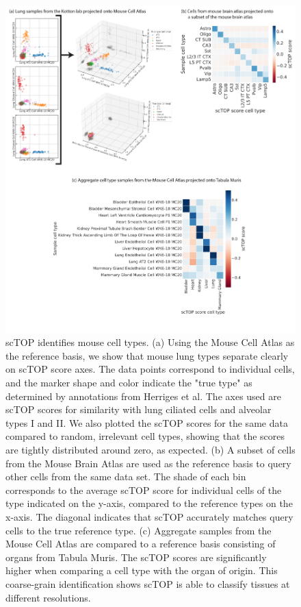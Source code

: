 \documentclass[aps,superscriptaddress, notitlepage,longbibliography]{revtex4-1}
\begin{document}
\begin{figure}
	\centering
		\includegraphics[scale=0.7]{figs/fig2.pdf}
	\caption{scTOP identifies mouse cell types. (a) Using the Mouse Cell Atlas as the reference basis, we show that mouse lung types separate clearly on scTOP score axes. The data points correspond to individual cells, and the marker shape and color indicate the "true type" as determined by annotations from Herriges et al. The axes used are scTOP scores for similarity with lung ciliated cells and alveolar types I and II. We also plotted the scTOP scores for the same data compared to random, irrelevant cell types, showing that the scores are tightly distributed around zero, as expected. (b) A subset of cells from the Mouse Brain Atlas are used as the reference basis to query other cells from the same data set. The shade of each bin corresponds to the average scTOP score for individual cells of the type indicated on the y-axis, compared to the reference types on the x-axis. The diagonal indicates that scTOP accurately matches query cells to the true reference type. (c) Aggregate samples from the Mouse Cell Atlas are compared to a reference basis consisting of organs from Tabula Muris. The scTOP scores are significantly higher when comparing a cell type with the organ of origin. This coarse-grain identification shows scTOP is able to classify tissues at different resolutions.}
	\label{FIG:2}
\end{figure}
\end{document}

